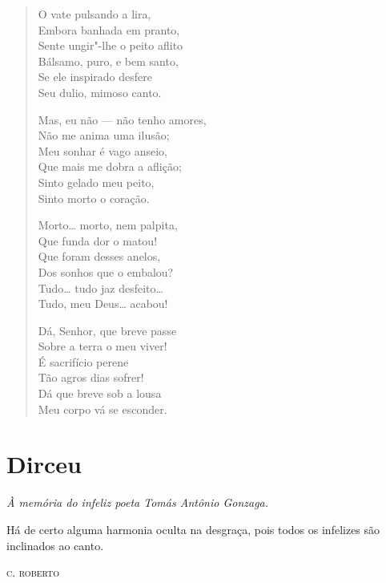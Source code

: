 \begin{verse}
O vate pulsando a lira,\\
Embora banhada em pranto,\\
Sente ungir"-lhe o peito aflito\\
Bálsamo, puro, e bem santo,\\
Se ele inspirado desfere\\
Seu dulio, mimoso canto.

Mas, eu não --- não tenho amores,\\
Não me anima uma ilusão;\\
Meu sonhar é vago anseio,\\
Que mais me dobra a aflição;\\
Sinto gelado meu peito,\\
Sinto morto o coração.

Morto\ldots{} morto, nem palpita,\\
Que funda dor o matou!\\
Que foram desses anelos,\\
Dos sonhos que o embalou?\\
Tudo\ldots{} tudo jaz desfeito\ldots{}\\
Tudo, meu Deus\ldots{} acabou!

Dá, Senhor, que breve passe\\
Sobre a terra o meu viver!\\
É sacrifício perene\\
Tão agros dias sofrer!\\
Dá que breve sob a lousa\\
Meu corpo vá se esconder.
\end{verse}

\chapter{Dirceu}

\hfill{}\emph{À memória do infeliz poeta Tomás Antônio Gonzaga.}

\epigraph{Há de certo alguma harmonia oculta na desgraça, pois todos os
infelizes são inclinados ao canto.}{\textsc{c. roberto}}

\medskip

